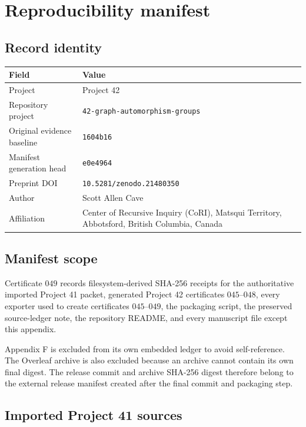 \section{Reproducibility manifest}

\subsection{Record identity}

\begin{tabular}{ll}
\toprule
Field & Value\\
\midrule
Project & Project 42\\
Repository project &
\texttt{42-graph-automorphism-groups}\\
Original evidence baseline & \texttt{1604b16}\\
Manifest generation head &
\texttt{e0e4964}\\
Preprint DOI & \texttt{10.5281/zenodo.21480350}\\
Author & Scott Allen Cave\\
Affiliation &
Center of Recursive Inquiry (CoRI), Matsqui Territory, Abbotsford,
British Columbia, Canada\\
\bottomrule
\end{tabular}

\subsection{Manifest scope}

Certificate \(049\) records filesystem-derived SHA-256 receipts for the
authoritative imported Project 41 packet, generated Project 42
certificates \(045\)--\(048\), every exporter used to create certificates
\(045\)--\(049\), the packaging script, the preserved source-ledger note,
the repository README, and every manuscript file except this appendix.

Appendix F is excluded from its own embedded ledger to avoid self-reference.
The Overleaf archive is also excluded because an archive
cannot contain its own final digest. The release commit and archive
SHA-256 digest therefore belong to the external release manifest created
after the final commit and packaging step.

\subsection{Imported Project 41 sources}

